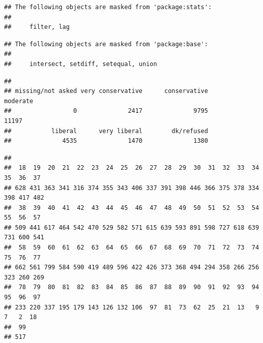 \documentclass[
]{book}
\newenvironment{Shaded}{\begin{snugshade}}{\end{snugshade}}
\newcommand{\CommentTok}[1]{\textcolor[rgb]{0.56,0.35,0.01}{\textit{#1}}}
\newcommand{\DocumentationTok}[1]{\textcolor[rgb]{0.56,0.35,0.01}{\textbf{\textit{#1}}}}
\newcommand{\FunctionTok}[1]{\textcolor[rgb]{0.00,0.00,0.00}{#1}}
\newcommand{\NormalTok}[1]{#1}
\newcommand{\OtherTok}[1]{\textcolor[rgb]{0.56,0.35,0.01}{#1}}
\newcommand{\SpecialCharTok}[1]{\textcolor[rgb]{0.00,0.00,0.00}{#1}}
\newcommand{\StringTok}[1]{\textcolor[rgb]{0.31,0.60,0.02}{#1}}
\theoremstyle{definition}
\theoremstyle{definition}
\theoremstyle{definition}
\theoremstyle{definition}
\theoremstyle{remark}
\begin{document}
\begin{verbatim}
## The following objects are masked from 'package:stats':
## 
##     filter, lag
\end{verbatim}

\begin{verbatim}
## The following objects are masked from 'package:base':
## 
##     intersect, setdiff, setequal, union
\end{verbatim}

\begin{Shaded}
\end{Shaded}

\begin{verbatim}
## 
## missing/not asked very conservative      conservative          moderate 
##                 0              2417              9795             11197 
##           liberal      very liberal        dk/refused 
##              4535              1470              1380
\end{verbatim}

\begin{Shaded}
\end{Shaded}

\begin{verbatim}
## 
##  18  19  20  21  22  23  24  25  26  27  28  29  30  31  32  33  34  35  36  37 
## 628 431 363 341 316 374 355 343 406 337 391 398 446 366 375 378 334 398 417 482 
##  38  39  40  41  42  43  44  45  46  47  48  49  50  51  52  53  54  55  56  57 
## 509 441 617 464 542 470 529 582 571 615 639 593 891 598 727 618 639 731 600 541 
##  58  59  60  61  62  63  64  65  66  67  68  69  70  71  72  73  74  75  76  77 
## 662 561 799 584 590 419 489 596 422 426 373 368 494 294 358 266 256 323 260 269 
##  78  79  80  81  82  83  84  85  86  87  88  89  90  91  92  93  94  95  96  97 
## 233 220 337 195 179 143 126 132 106  97  81  73  62  25  21  13   9   7   2  18 
##  99 
## 517
\end{verbatim}
\end{document}
